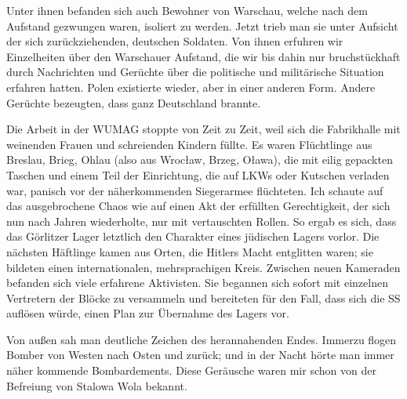 Unter ihnen befanden sich auch Bewohner von Warschau, welche nach dem Aufstand gezwungen waren, isoliert zu werden. Jetzt trieb man sie unter Aufsicht der sich zurückziehenden, deutschen Soldaten. Von ihnen erfuhren wir Einzelheiten über den Warschauer Aufstand, die wir bis dahin nur bruchstückhaft durch Nachrichten und Gerüchte über die politische und militärische Situation erfahren hatten. Polen existierte wieder, aber in einer anderen Form. Andere Gerüchte bezeugten, dass ganz Deutschland brannte. 

Die Arbeit in der WUMAG stoppte von Zeit zu Zeit, weil sich die Fabrikhalle mit weinenden Frauen und schreienden Kindern füllte. Es waren Flüchtlinge aus Breslau, Brieg, Ohlau (also aus Wroc\l aw, Brzeg, O\l awa), die mit eilig gepackten Taschen und einem Teil der Einrichtung, die auf LKWs oder Kutschen verladen war, panisch vor der näherkommenden Siegerarmee flüchteten. Ich schaute auf das ausgebrochene Chaos wie auf einen Akt der erfüllten Gerechtigkeit, der sich nun nach Jahren wiederholte, nur mit vertauschten Rollen. So ergab es sich, dass das Görlitzer Lager letztlich den Charakter eines jüdischen Lagers vorlor. Die nächsten Häftlinge kamen aus Orten, die Hitlers Macht entglitten waren; sie bildeten einen internationalen, mehrsprachigen Kreis. Zwischen neuen Kameraden befanden sich viele erfahrene Aktivisten. Sie begannen sich sofort mit einzelnen Vertretern der Blöcke zu versammeln und bereiteten für den Fall, dass sich die SS auflösen würde, einen Plan zur Übernahme des Lagers vor.

Von außen sah man deutliche Zeichen des herannahenden Endes. Immerzu flogen Bomber von Westen nach Osten und zurück; und in der Nacht hörte man immer näher kommende Bombardements. Diese Geräusche waren mir schon von der Befreiung von Stalowa Wola bekannt.

